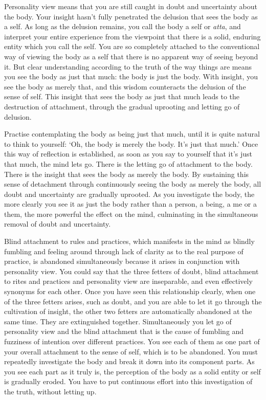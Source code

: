 Personality view means that you are still caught in doubt and uncertainty about the body. Your insight hasn't fully penetrated the delusion that sees the body as a self. As long as the delusion remains, you call the body a self or \textit{atta}, and interpret your entire experience from the viewpoint that there is a solid, enduring entity which you call the self. You are so completely attached to the conventional way of viewing the body as a self that there is no apparent way of seeing beyond it. But clear understanding according to the truth of the way things are means you see the body as just that much: the body is just the body. With insight, you see the body as merely that, and this wisdom counteracts the delusion of the sense of self. This insight that sees the body as just that much leads to the destruction of attachment, through the gradual uprooting and letting go of delusion.

Practise contemplating the body as being just that much, until it is quite natural to think to yourself: `Oh, the body is merely the body. It's just that much.' Once this way of reflection is established, as soon as you say to yourself that it's just that much, the mind lets go. There is the letting go of attachment to the body. There is the insight that sees the body as merely the body. By sustaining this sense of detachment through continuously seeing the body as merely the body, all doubt and uncertainty are gradually uprooted. As you investigate the body, the more clearly you see it as just the body rather than a person, a being, a me or a them, the more powerful the effect on the mind, culminating in the simultaneous removal of doubt and uncertainty.

Blind attachment to rules and practices, which manifests in the mind as blindly fumbling and feeling around through lack of clarity as to the real purpose of practice, is abandoned simultaneously because it arises in conjunction with personality view. You could say that the three fetters of doubt, blind attachment to rites and practices and personality view are inseparable, and even effectively synonyms for each other. Once you have seen this relationship clearly, when one of the three fetters arises, such as doubt, and you are able to let it go through the cultivation of insight, the other two fetters are automatically abandoned at the same time. They are extinguished together. Simultaneously you let go of personality view and the blind attachment that is the cause of fumbling and fuzziness of intention over different practices. You see each of them as one part of your overall attachment to the sense of self, which is to be abandoned. You must repeatedly investigate the body and break it down into its component parts. As you see each part as it truly is, the perception of the body as a solid entity or self is gradually eroded. You have to put continuous effort into this investigation of the truth, without letting up.

